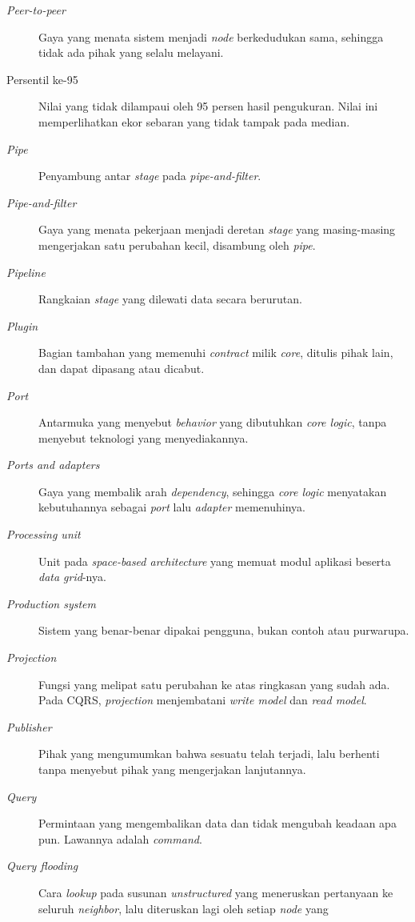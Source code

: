 \begin{description}
  \item[\textit{Peer-to-peer}] Gaya yang menata sistem menjadi \textit{node}
    berkedudukan sama, sehingga tidak ada pihak yang selalu melayani.
  \item[Persentil ke-95] Nilai yang tidak dilampaui oleh 95 persen hasil
    pengukuran. Nilai ini memperlihatkan ekor sebaran yang tidak tampak pada
    median.
  \item[\textit{Pipe}] Penyambung antar \textit{stage} pada
    \textit{pipe-and-filter}.
  \item[\textit{Pipe-and-filter}] Gaya yang menata pekerjaan menjadi deretan
    \textit{stage} yang masing-masing mengerjakan satu perubahan kecil, disambung
    oleh \textit{pipe}.
  \item[\textit{Pipeline}] Rangkaian \textit{stage} yang dilewati data secara
    berurutan.
  \item[\textit{Plugin}] Bagian tambahan yang memenuhi \textit{contract} milik
    \textit{core}, ditulis pihak lain, dan dapat dipasang atau dicabut.
  \item[\textit{Port}] Antarmuka yang menyebut \textit{behavior} yang dibutuhkan
    \textit{core logic}, tanpa menyebut teknologi yang menyediakannya.
  \item[\textit{Ports and adapters}] Gaya yang membalik arah \textit{dependency},
    sehingga \textit{core logic} menyatakan kebutuhannya sebagai \textit{port}
    lalu \textit{adapter} memenuhinya.
  \item[\textit{Processing unit}] Unit pada \textit{space-based architecture}
    yang memuat modul aplikasi beserta \textit{data grid}-nya.
  \item[\textit{Production system}] Sistem yang benar-benar dipakai pengguna, bukan contoh
    atau purwarupa.
  \item[\textit{Projection}] Fungsi yang melipat satu perubahan ke atas
    ringkasan yang sudah ada. Pada CQRS, \textit{projection} menjembatani
    \textit{write model} dan \textit{read model}.
  \item[\textit{Publisher}] Pihak yang mengumumkan bahwa sesuatu telah terjadi,
    lalu berhenti tanpa menyebut pihak yang mengerjakan lanjutannya.
  \item[\textit{Query}] Permintaan yang mengembalikan data dan tidak mengubah
    keadaan apa pun. Lawannya adalah \textit{command}.
  \item[\textit{Query flooding}] Cara \textit{lookup} pada susunan
    \textit{unstructured} yang meneruskan pertanyaan ke seluruh
    \textit{neighbor}, lalu diteruskan lagi oleh setiap \textit{node} yang

\end{description}
